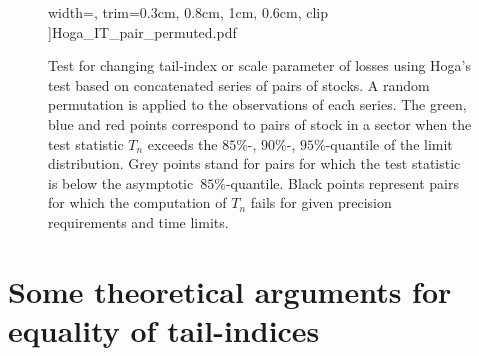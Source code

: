\documentclass[11pt,a4]{amsart}
\newcommand{\asy}{asymptotic}
\newcommand{\ds}{distribution}
\newcommand{\1}{{\mathbf 1}}
\begin{document}
\begin{figure}[htb!]
\begin{minipage}{0.33\linewidth}
      width=\textwidth,
      trim={0.3cm, 0.8cm, 1cm, 0.6cm}, clip
    ]{Hoga_IT_pair_permuted.pdf}
  \end{minipage}
  \caption{
    Test for changing tail-index or scale parameter
    of losses
    using Hoga's test based on concatenated series of pairs of
    stocks.
    A random permutation is applied to the observations of each
    series.
    The green, blue and red points
    correspond to pairs of stock in a sector 
    when the test statistic $T_n$ exceeds the $85\%$-, $90\%$-,
    $95\%$-quantile of the limit \ds .
    Grey points stand for pairs for which the test statistic is below
    the \asy\ $85\%$-quantile. Black points represent 
    pairs for which the computation of $T_n$ fails for given precision  
    requirements and time limits.
  }
  \label{fig:PairTest:permuted} 
\end{figure}


\newpage
\section{Some theoretical arguments for equality of tail-indices}\setcounter{equation}{0}\label{sec:2}
\end{document}
